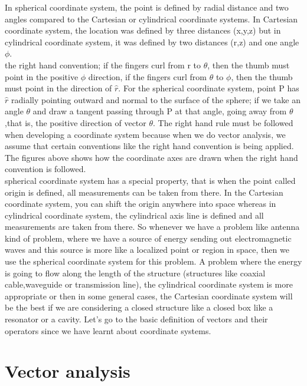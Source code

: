 	 In spherical coordinate system, the point is defined by radial distance and two angles compared to the Cartesian or cylindrical coordinate systems. In Cartesian coordinate system, the location was defined by three distances (x,y,z) but in cylindrical coordinate system, it was defined by two distances (r,z) and one angle $\phi$.\\
	  the right hand convention; if the fingers curl from r to $\theta$, then the thumb must point in the positive $\phi$ direction, if the fingers curl from $\theta$ to $\phi$, then the thumb must point in the direction of $\hat{r}$. For the spherical coordinate system, point P has $\hat{r}$ radially pointing outward and normal to the surface of the sphere; if we take an angle $\theta$ and draw a tangent passing through P at that angle, going away from $\theta$,that is, the positive direction of vector $\theta$. The right hand rule must be followed when developing a coordinate system because when we do vector analysis, we assume that certain conventions like the right hand convention is being applied. The figures above shows how the coordinate axes are drawn when the right hand convention is followed.\\
	  spherical coordinate system has a special property, that is when the point called origin is defined, all measurements can be taken from there. In the Cartesian coordinate system, you can shift the origin anywhere into space whereas in cylindrical coordinate system, the cylindrical axis line is defined and all measurements are taken from there. So whenever we have a problem like antenna kind of problem, where we have a source of energy sending out electromagnetic waves and this source is more like a localized point or region in space, then we use the spherical coordinate system for this problem. A problem where the energy is going to flow along the length of the structure (structures like coaxial cable,waveguide or transmission line), the cylindrical coordinate system is more appropriate or then in some general cases, the Cartesian coordinate system will be the best if we are considering a closed structure like a closed box like a resonator or a cavity. Let's go to the basic definition of vectors and their operators since we have learnt about coordinate systems. \section{Vector analysis}

